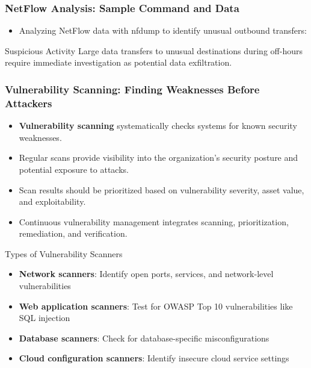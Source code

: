 \documentclass{beamer}
\begin{document}
    
\begin{frame}[fragile]
    \frametitle{NetFlow Analysis: Sample Command and Data}
    \begin{itemize}
    \item Analyzing NetFlow data with nfdump to identify unusual outbound transfers:
    \end{itemize}
    
    \tiny
    
    \scriptsize
    \begin{alertblock}{Suspicious Activity}
    Large data transfers to unusual destinations during off-hours require immediate investigation as potential data exfiltration.
    \end{alertblock}
    \end{frame}
    
    \begin{frame}
    \frametitle{Vulnerability Scanning: Finding Weaknesses Before Attackers}
    \begin{itemize}
    \item \textbf{Vulnerability scanning} systematically checks systems for known security weaknesses.
    \item Regular scans provide visibility into the organization's security posture and potential exposure to attacks.
    \item Scan results should be prioritized based on vulnerability severity, asset value, and exploitability.
    \item Continuous vulnerability management integrates scanning, prioritization, remediation, and verification.
    \end{itemize}
    
    \begin{exampleblock}{Types of Vulnerability Scanners}
        \scriptsize
    \begin{itemize}
    \item \textbf{Network scanners}: Identify open ports, services, and network-level vulnerabilities
    \item \textbf{Web application scanners}: Test for OWASP Top 10 vulnerabilities like SQL injection
    \item \textbf{Database scanners}: Check for database-specific misconfigurations
    \item \textbf{Cloud configuration scanners}: Identify insecure cloud service settings
    \end{itemize}
    \end{exampleblock}
    \end{frame}
\end{document}
